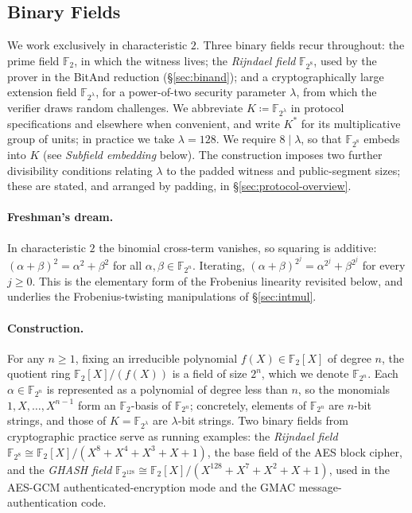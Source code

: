 \documentclass{article}
\theoremstyle{definition}
\newcommand{\FF}[1]{\mathbb{F}_{#1}}
\begin{document}
\subsection{Binary Fields}
\label{sec:binary-fields}

We work exclusively in characteristic $2$. Three binary fields recur throughout: the prime field $\FF{2}$, in which the witness lives; the \emph{Rijndael field} $\FF{2^8}$, used by the prover in the BitAnd reduction (\S\ref{sec:binand}); and a cryptographically large extension field $\FF{2^\lambda}$, for a power-of-two security parameter $\lambda$, from which the verifier draws random challenges. We abbreviate $K \coloneqq \FF{2^\lambda}$ in protocol specifications and elsewhere when convenient, and write $K^*$ for its multiplicative group of units; in practice we take $\lambda = 128$. We require $8 \mid \lambda$, so that $\FF{2^8}$ embeds into $K$ (see \emph{Subfield embedding} below). The construction imposes two further divisibility conditions relating $\lambda$ to the padded witness and public-segment sizes; these are stated, and arranged by padding, in \S\ref{sec:protocol-overview}.

\paragraph{Freshman's dream.}
In characteristic $2$ the binomial cross-term vanishes, so squaring is additive: $(\alpha + \beta)^2 = \alpha^2 + \beta^2$ for all $\alpha, \beta \in \FF{2^n}$. Iterating, $(\alpha + \beta)^{2^j} = \alpha^{2^j} + \beta^{2^j}$ for every $j \geq 0$. This is the elementary form of the Frobenius linearity revisited below, and underlies the Frobenius-twisting manipulations of \S\ref{sec:intmul}.

\paragraph{Construction.}
For any $n \geq 1$, fixing an irreducible polynomial $f(X) \in \FF{2}[X]$ of degree $n$, the quotient ring $\FF{2}[X] / (f(X))$ is a field of size $2^n$, which we denote $\FF{2^n}$. Each $\alpha \in \FF{2^n}$ is represented as a polynomial of degree less than $n$, so the monomials $1, X, \ldots, X^{n - 1}$ form an $\FF{2}$-basis of $\FF{2^n}$; concretely, elements of $\FF{2^n}$ are $n$-bit strings, and those of $K = \FF{2^\lambda}$ are $\lambda$-bit strings. Two binary fields from cryptographic practice serve as running examples: the \emph{Rijndael field} $\FF{2^8} \cong \FF{2}[X] / (X^8 + X^4 + X^3 + X + 1)$, the base field of the AES block cipher, and the \emph{GHASH field} $\FF{2^{128}} \cong \FF{2}[X] / (X^{128} + X^7 + X^2 + X + 1)$, used in the AES-GCM authenticated-encryption mode and the GMAC message-authentication code.
\end{document}
